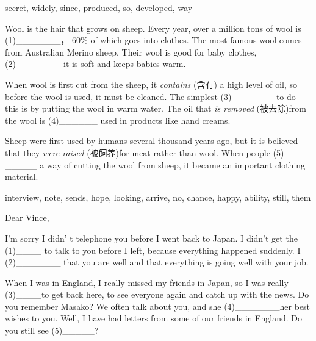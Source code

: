 \documentclass{ctexart}
\begin{document}
\title{}
\author{l allen}
\date{\today}
\maketitle

\begin{center}
secret, widely, since, produced, so, developed, way 
\end{center}

Wool is the hair that grows on sheep. Every year, over a million tons of 
wool is (1){\_}{\_}{\_}{\_}{\_}{\_}{\_}， 60{\%} of which goes into clothes. 
The most famous wool comes from Australian Merino sheep. Their wool is good 
for baby clothes, (2){\_}{\_}{\_}{\_}{\_}{\_}{\_} it is soft and keeps 
babies warm.

When wool is first cut from the sheep, it \textit{contains} (含有) a high level of oil, so 
before the wool is used, it must be cleaned. The simplest 
(3){\_}{\_}{\_}{\_}{\_}{\_}{\_}to do this is by putting the wool in warm 
water. The oil that \textit{is removed }(被去除)from the wool is (4){\_}{\_}{\_}{\_}{\_}{\_} 
used in products like hand creams.

Sheep were first used by humans several thousand years ago, but it is 
believed that they \textit{were raised} (被飼养)for meat rather than wool. When people (5) 
{\_}{\_}{\_}{\_}{\_} a way of cutting the wool from sheep, it became an 
important clothing material.

\begin{center}
interview, note, sends, hope, looking, arrive, no, chance, happy, ability, 
still, them 
\end{center}

Dear Vince,

I'm sorry I didn' t telephone you before I went back to Japan. I didn't get 
the (1){\_}{\_}{\_}{\_} to talk to you before I left, because everything 
happened suddenly. I (2){\_}{\_}{\_}{\_}{\_}{\_}{\_} that you are well and 
that everything is going well with your job.

When I was in England, I really missed my friends in Japan, so I was really 
(3){\_}{\_}{\_}{\_}to get back here, to see everyone again and catch up with 
the news. Do you remember Masako? We often talk about you, and she 
(4){\_}{\_}{\_}{\_}{\_}{\_}{\_}her best wishes to you. Well, I have had 
letters from some of our friends in England. Do you still see 
(5){\_}{\_}{\_}{\_}{\_}?
\end{document}
